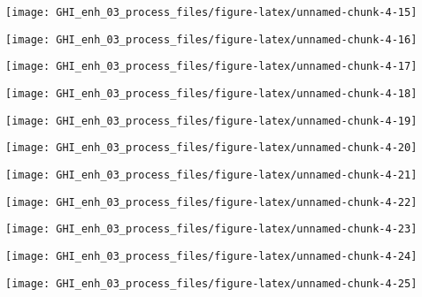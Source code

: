 \documentclass[
  10pt,
  a4paper,oneside]{article}
\begin{document}
\begin{center}\texttt{[image: GHI\_enh\_03\_process\_files/figure-latex/unnamed-chunk-4-15]} \end{center}

\begin{center}\texttt{[image: GHI\_enh\_03\_process\_files/figure-latex/unnamed-chunk-4-16]} \end{center}

\begin{center}\texttt{[image: GHI\_enh\_03\_process\_files/figure-latex/unnamed-chunk-4-17]} \end{center}

\begin{center}\texttt{[image: GHI\_enh\_03\_process\_files/figure-latex/unnamed-chunk-4-18]} \end{center}

\begin{center}\texttt{[image: GHI\_enh\_03\_process\_files/figure-latex/unnamed-chunk-4-19]} \end{center}

\begin{center}\texttt{[image: GHI\_enh\_03\_process\_files/figure-latex/unnamed-chunk-4-20]} \end{center}

\begin{center}\texttt{[image: GHI\_enh\_03\_process\_files/figure-latex/unnamed-chunk-4-21]} \end{center}

\begin{center}\texttt{[image: GHI\_enh\_03\_process\_files/figure-latex/unnamed-chunk-4-22]} \end{center}

\begin{center}\texttt{[image: GHI\_enh\_03\_process\_files/figure-latex/unnamed-chunk-4-23]} \end{center}

\begin{center}\texttt{[image: GHI\_enh\_03\_process\_files/figure-latex/unnamed-chunk-4-24]} \end{center}

\begin{center}\texttt{[image: GHI\_enh\_03\_process\_files/figure-latex/unnamed-chunk-4-25]} \end{center}
\end{document}
